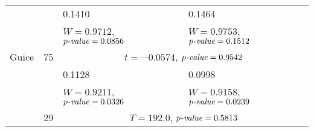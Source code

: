 \begin{table}[]
\begin{adjustbox}{center}
\begin{tabular}{llll}
 &  & 0.1410 & 0.1464 \\
 &  & $W = 0.9712$, $p\emph{-value} = 0.0856$ & $W = 0.9753$, $p\emph{-value} = 0.1512$ \\
\multirow{-3}{*}{Guice} & \multirow{-3}{*}{75} & \multicolumn{2}{c}{$t = -0.0574$, $p\emph{-value} = 0.9542$} \\
\rowcolor{Gray}
\cellcolor{Gray} & \cellcolor{Gray} & 0.1128 & 0.0998 \\
\rowcolor{Gray}
\cellcolor{Gray} & \cellcolor{Gray} & $W = 0.9211$, $p\emph{-value} = 0.0326$ & $W = 0.9158$, $p\emph{-value} = 0.0239$ \\
\rowcolor{Gray}
\multirow{-3}{*}{\cellcolor{Gray}Jsoup} & \multirow{-3}{*}{\cellcolor{Gray}29} & \multicolumn{2}{c}{\cellcolor{Gray}$T = 192.0$, $p\emph{-value} = 0.5813$}\\
\bottomrule
\end{tabular}
\end{adjustbox}
\end{table}

